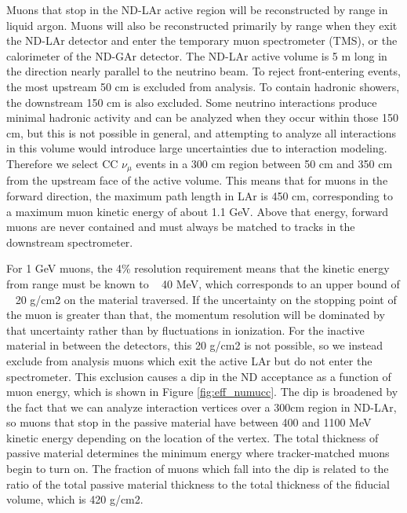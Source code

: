 Muons that stop in the ND-LAr active region will be reconstructed by range in liquid argon. Muons will also be reconstructed primarily by range when they exit the ND-LAr detector and enter the temporary muon spectrometer (TMS), or the calorimeter of the ND-GAr detector. The ND-LAr active volume is 5 m long in the direction nearly parallel to the neutrino beam. To reject front-entering events, the most upstream 50 cm is excluded from analysis. To contain hadronic showers, the downstream 150 cm is also excluded. Some neutrino interactions produce minimal hadronic activity and can be analyzed when they occur within those 150 cm, but this is not possible in general, and attempting to analyze all interactions in this volume would introduce large uncertainties due to interaction modeling. Therefore we select CC $\nu_\mu$ events in a 300 cm region between 50 cm and 350 cm from the upstream face of the active volume. This means that for muons in the forward direction, the maximum path length in LAr is 450 cm, corresponding to a maximum muon kinetic energy of about 1.1 GeV. Above that energy, forward muons are never contained and must always be matched to tracks in the downstream spectrometer.

For 1 GeV muons, the 4\% resolution requirement means that the kinetic energy from range must be known to ~ 40 MeV, which corresponds to an upper bound of ~ 20 g/cm2 on the material traversed. If the uncertainty on the stopping point of the muon is greater than that, the momentum resolution will be dominated by that uncertainty rather than by fluctuations in ionization. For the inactive material in between the detectors, this 20 g/cm2 is not possible, so we instead exclude from analysis muons which exit the active LAr but do not enter the spectrometer. This exclusion causes a dip in the ND acceptance as a function of muon energy, which is shown in Figure \ref{fig:eff_numucc}. The dip is broadened by the fact that we can analyze interaction vertices over a 300cm region in ND-LAr, so muons that stop in the passive material have between 400 and 1100 MeV kinetic energy depending on the location of the vertex. The total thickness of passive material determines the minimum energy where tracker-matched muons begin to turn on. The fraction of muons which fall into the dip is related to the ratio of the total passive material thickness to the total thickness of the fiducial volume, which is 420 g/cm2.

